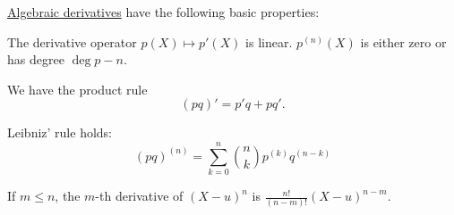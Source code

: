 \begin{proposition}\label{thm:def:algebraic_derivative}
  \hyperref[def:algebraic_derivative]{Algebraic derivatives} have the following basic properties:
  \begin{thmenum}
     The derivative operator \( p(X) \mapsto p'(X) \) is linear.
     \( p^{(n)}(X) \) is either zero or has degree \( \deg p - n \).

     We have the product rule
    \begin{equation}\label{eq:thm:def:algebraic_derivative/product}
      (pq)' = p'q + pq'.
    \end{equation}

     Leibniz' rule holds:
    \begin{equation}\label{thm:def:algebraic_derivative/product}
      (pq)^{(n)} = \sum_{k=0}^n \binom n k p^{(k)} q^{(n-k)}
    \end{equation}

     If \( m \leq n \), the \( m \)-th derivative of \( (X - u)^n \) is \( \tfrac {n!} {(n-m)!} (X - u)^{n-m} \).
  \end{thmenum}
\end{proposition}

